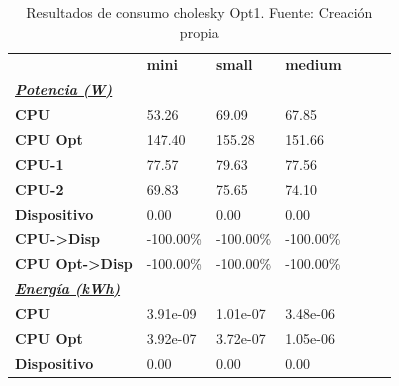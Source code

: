 \begin{table}[H]
    \centering
    \begin{tabular}{lllllll}
    \rowcolor[HTML]{DAE8FC} \ & \textbf{mini} & \textbf{	small} & \textbf{	medium} \\
    \cellcolor[HTML]{DAE8FC} \textbf{\textbf{{\emph{{\underline{{Potencia (W)}}}}}}} &  & 	 & 	 \\
    \rowcolor[HTML]{EFEFEF} \cellcolor[HTML]{DAE8FC} \textbf{CPU} & 53.26 & 	69.09 & 	67.85 \\
    \cellcolor[HTML]{DAE8FC} \textbf{CPU Opt} & 147.40 & 	155.28 & 	151.66 \\
    \rowcolor[HTML]{EFEFEF} \cellcolor[HTML]{DAE8FC} \textbf{\quad CPU-1} & 77.57 & 	79.63 & 	77.56 \\
    \cellcolor[HTML]{DAE8FC} \textbf{\quad CPU-2} & 69.83 & 	75.65 & 	74.10 \\
    \rowcolor[HTML]{EFEFEF} \cellcolor[HTML]{DAE8FC} \textbf{Dispositivo} & 0.00 & 	0.00 & 	0.00 \\
    \cellcolor[HTML]{DAE8FC} \textbf{CPU->Disp} & -100.00\% & 	-100.00\% & 	-100.00\% \\
    \rowcolor[HTML]{EFEFEF} \cellcolor[HTML]{DAE8FC} \textbf{CPU Opt->Disp} & -100.00\% & 	-100.00\% & 	-100.00\% \\
    \cellcolor[HTML]{DAE8FC} \textbf{\textbf{{\emph{{\underline{{Energía (kWh)}}}}}}} &  & 	 & 	 \\
    \rowcolor[HTML]{EFEFEF} \cellcolor[HTML]{DAE8FC} \textbf{CPU} & 3.91e-09 & 	1.01e-07 & 	3.48e-06 \\
    \cellcolor[HTML]{DAE8FC} \textbf{CPU Opt} & 3.92e-07 & 	3.72e-07 & 	1.05e-06 \\
    \rowcolor[HTML]{EFEFEF} \cellcolor[HTML]{DAE8FC} \textbf{Dispositivo} & 0.00 & 	0.00 & 	0.00 \\
    \end{tabular}
    \caption[Resultados de consumo cholesky Opt1]{{Resultados de consumo cholesky Opt1. Fuente: Creación propia}}
    \label{table_test_cholesky_Opt1_hw_powerResults}
\end{table}